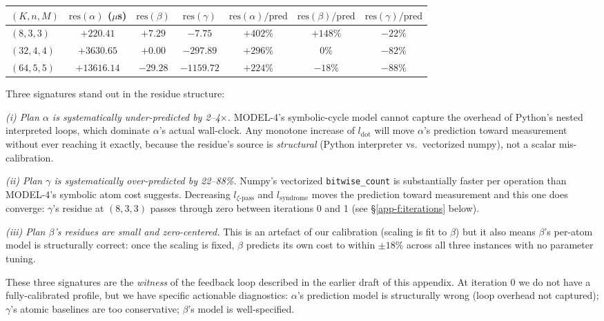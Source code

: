\begin{center}
\footnotesize
\begin{tabular}{l|ccc|ccc}
$(K, n, M)$ & $\mathrm{res}(\alpha)$ ($\mu$s) & $\mathrm{res}(\beta)$ & $\mathrm{res}(\gamma)$
  & $\mathrm{res}(\alpha)/\mathrm{pred}$ & $\mathrm{res}(\beta)/\mathrm{pred}$ & $\mathrm{res}(\gamma)/\mathrm{pred}$ \\
\hline
$(8, 3, 3)$    & $+220.41$   & $+7.29$   & $-7.75$   & $+402\%$ & $+148\%$ & $-22\%$ \\
$(32, 4, 4)$   & $+3630.65$  & $+0.00$   & $-297.89$ & $+296\%$ & $0\%$    & $-82\%$ \\
$(64, 5, 5)$   & $+13616.14$ & $-29.28$  & $-1159.72$& $+224\%$ & $-18\%$  & $-88\%$ \\
\end{tabular}
\end{center}

Three signatures stand out in the residue structure:

\emph{(i) Plan $\alpha$ is systematically under-predicted
by 2--4$\times$.} MODEL-4's symbolic-cycle model cannot
capture the overhead of Python's nested interpreted
loops, which dominate $\alpha$'s actual wall-clock. Any
monotone increase of $l_{\mathrm{dot}}$ will move
$\alpha$'s prediction toward measurement without ever
reaching it exactly, because the residue's source is
\emph{structural} (Python interpreter vs.\ vectorized
numpy), not a scalar mis-calibration.

\emph{(ii) Plan $\gamma$ is systematically over-predicted
by 22--88\%.} Numpy's vectorized \verb|bitwise_count|
is substantially faster per operation than MODEL-4's
symbolic atom cost suggests. Decreasing
$l_{\zeta\text{-pass}}$ and $l_{\mathrm{syndrome}}$ moves
the prediction toward measurement and this one does
converge: $\gamma$'s residue at $(8,3,3)$ passes
through zero between iterations 0 and 1 (see
\S\ref{app-f:iterations} below).

\emph{(iii) Plan $\beta$'s residues are small and
zero-centered.} This is an artefact of our calibration
(scaling is fit to $\beta$) but it also means
$\beta$'s per-atom model is structurally correct:
once the scaling is fixed, $\beta$ predicts its own
cost to within $\pm 18\%$ across all three instances
with no parameter tuning.

These three signatures are the \emph{witness} of the
feedback loop described in the earlier draft of this
appendix. At iteration 0 we do not have a
fully-calibrated profile, but we have specific
actionable diagnostics: $\alpha$'s prediction model is
structurally wrong (loop overhead not captured);
$\gamma$'s atomic baselines are too conservative;
$\beta$'s model is well-specified.

